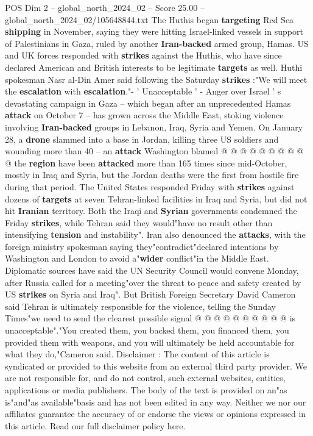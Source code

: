 \begin{textsample}{POS Dim 2 – global\_north\_2024\_02 – Score 25.00 – global\_north\_2024\_02/105648844.txt}
The Huthis began \textbf{targeting} Red Sea \textbf{shipping} in November, saying they were hitting Israel-linked vessels in support of Palestinians in Gaza, ruled by another \textbf{Iran-backed} armed group, Hamas.
US and UK forces responded with \textbf{strikes} against the Huthis, who have since declared American and British interests to be legitimate \textbf{targets} as well.
Huthi spokesman Nasr al-Din Amer said following the Saturday \textbf{strikes} :"We will meet the \textbf{escalation} with \textbf{escalation}."- ' Unacceptable ' - Anger over Israel ' s devastating campaign in Gaza -- which began after an unprecedented Hamas \textbf{attack} on October 7 -- has grown across the Middle East, stoking violence involving \textbf{Iran-backed} groups in Lebanon, Iraq, Syria and Yemen.
On January 28, a \textbf{drone} slammed into a base in Jordan, killing three US soldiers and wounding more than 40 -- an \textbf{attack} Washington blamed @ @ @ @ @ @ @ @ @ @ the \textbf{region} have been \textbf{attacked} more than 165 times since mid-October, mostly in Iraq and Syria, but the Jordan deaths were the first from hostile fire during that period.
The United States responded Friday with \textbf{strikes} against dozens of \textbf{targets} at seven Tehran-linked facilities in Iraq and Syria, but did not hit \textbf{Iranian} territory.
Both the Iraqi and \textbf{Syrian} governments condemned the Friday \textbf{strikes}, while Tehran said they would"have no result other than intensifying \textbf{tension} and instability".
Iran also denounced the \textbf{attacks}, with the foreign ministry spokesman saying they"contradict"declared intentions by Washington and London to avoid a"\textbf{wider} conflict"in the Middle East.
Diplomatic sources have said the UN Security Council would convene Monday, after Russia called for a meeting"over the threat to peace and safety created by US \textbf{strikes} on Syria and Iraq".
But British Foreign Secretary David Cameron said Tehran is ultimately responsible for the violence, telling the Sunday Times"we need to send the clearest possible signal @ @ @ @ @ @ @ @ @ @ is unacceptable"."You created them, you backed them, you financed them, you provided them with weapons, and you will ultimately be held accountable for what they do,"Cameron said.
Disclaimer : The content of this article is syndicated or provided to this website from an external third party provider.
We are not responsible for, and do not control, such external websites, entities, applications or media publishers.
The body of the text is provided on an"as is"and"as available"basis and has not been edited in any way.
Neither we nor our affiliates guarantee the accuracy of or endorse the views or opinions expressed in this article.
Read our full disclaimer policy here.

\end{textsample}
